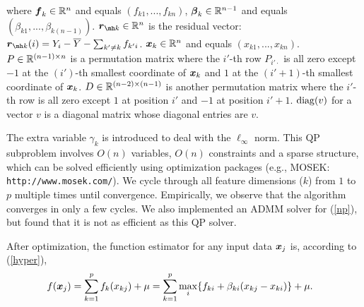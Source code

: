 where $\boldsymbol{f}_k \in {\mathbb R}^n$ and equals $(f_{k1}, ..., f_{kn})$, $\boldsymbol{\beta}_k \in {\mathbb R}^{n-1}$ and equals $(\beta_{k1}, ..., \beta_{k(n-1)})$. $\bds{r}_{\mh k} \in \R^n$ is the residual vector: $\bds{r}_{\mh k}(i) = Y_i - \bar{Y} - \sum_{k' \neq k} f_{k' i}$. $\boldsymbol{x}_k \in {\mathbb R}^n$ and equals $(x_{k1}, ..., x_{kn})$. \\

$P \in {\mathbb R}^{(n-1) \times n}$ is a permutation matrix where the $i'$-th row $P_{i' \cdot}$ is all zero except $-1$ at the $(i')$-th smallest coordinate of $\boldsymbol{x}_k$ and $1$ at the $(i'+1)$-th smallest coordinate of $\boldsymbol{x}_k$. $D \in {\mathbb R}^{(n-2) \times (n-1)}$ is another permutation matrix where the $i'$-th row is all zero except $1$ at position $i'$ and $-1$ at position $i'+1$. $\mathop{\rm diag}( v )$ for a vector $v$ is a diagonal matrix whose diagonal entries are $v$.

The extra variable $\gamma_{k}$ is introduced to deal with the $\ell_{\infty}$ norm. This QP subproblem involves $O(n)$ variables, $O(n)$ constraints and a sparse structure, 
which can be solved efficiently using optimization packages (e.g., MOSEK: \verb+http://www.mosek.com/+).  We cycle through all feature dimensions ($k$) from $1$ to $p$ multiple times until convergence.
Empirically, we observe that the algorithm converges in only a few cycles. We also implemented an ADMM solver for (\ref{np}), but found that it is not as efficient as this QP solver.

After optimization, the function estimator for any input data $\boldsymbol{x}_j$ is, according to (\ref{hyper}),
\begin{equation}
\begin{split}
\nonumber
      f(\boldsymbol{x}_j) & = \sum_{k=1}^{p}f_k(x_{kj})+\mu 
= \sum_{k=1}^{p}\max_{i} \{f_{ki}+\beta_{ki}(x_{kj}-x_{ki})\} +
      \mu.
\end{split}
\end{equation} 

